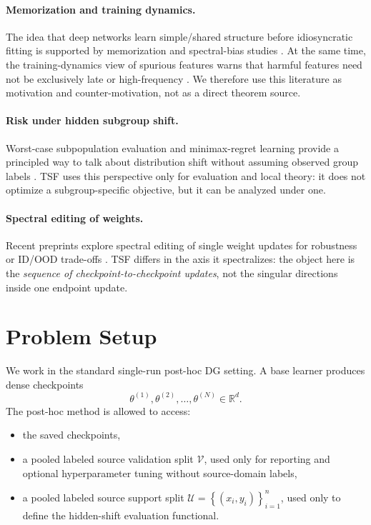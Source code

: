 \documentclass{article}
\newcommand{\RR}{\mathbb{R}}
\newcommand{\cU}{\mathcal{U}}
\newcommand{\cV}{\mathcal{V}}
\newcommand{\ood}{OOD}
\newcommand{\tsf}{\textup{\textsc{TSF}}}
\newcommand{\braces}[1]{\left\{ #1 \right\}}
\begin{document}
\paragraph{Memorization and training dynamics.}
The idea that deep networks learn simple/shared structure before idiosyncratic fitting is supported by memorization and spectral-bias studies \citep{arpit2017memorization,rahaman2019spectralbias}. At the same time, the training-dynamics view of spurious features warns that harmful features need not be exclusively late or high-frequency \citep{murali2023spurious}. We therefore use this literature as motivation and counter-motivation, not as a direct theorem source.

\paragraph{Risk under hidden subgroup shift.}
Worst-case subpopulation evaluation and minimax-regret learning provide a principled way to talk about distribution shift without assuming observed group labels \citep{li2021worstcase,agarwal2022mro}. \tsf{} uses this perspective only for evaluation and local theory: it does not optimize a subgroup-specific objective, but it can be analyzed under one.

\paragraph{Spectral editing of weights.}
Recent preprints explore spectral editing of single weight updates for robustness or ID/\ood{} trade-offs \citep{abdollahpoorrostam2026monosoup}. \tsf{} differs in the axis it spectralizes: the object here is the \emph{sequence of checkpoint-to-checkpoint updates}, not the singular directions inside one endpoint update.

\section{Problem Setup}
\label{sec:setup}

We work in the standard single-run post-hoc DG setting. A base learner produces dense checkpoints
\[
\theta^{(1)}, \theta^{(2)}, \ldots, \theta^{(N)} \in \RR^d.
\]
The post-hoc method is allowed to access:
\begin{itemize}[leftmargin=1.4em]
    \item the saved checkpoints,
    \item a pooled labeled source validation split \(\cV\), used only for reporting and optional hyperparameter tuning without source-domain labels,
    \item a pooled labeled source support split \(\cU=\braces{(x_i,y_i)}_{i=1}^n\), used only to define the hidden-shift evaluation functional.
\end{itemize}
\end{document}
